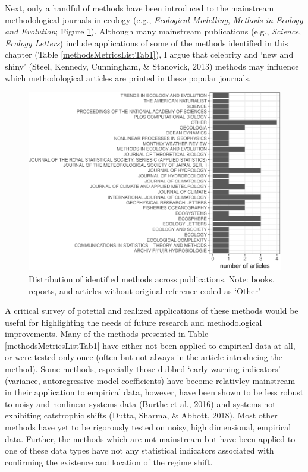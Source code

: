 \documentclass[12pt,twoside,openany]{reedthesis}
\begin{document}
Next, only a handful of methods have been introduced to the mainstream
methodological journals in ecology (e.g., \emph{Ecological Modelling},
\emph{Methods in Ecology and Evolution}; Figure \ref{fig:jrnlDistFig}).
Although many mainstream publications (e.g., \emph{Science},
\emph{Ecology Letters}) include applications of some of the methods
identified in this chapter (Table \ref{methodsMetricsListTab1}), I argue
that celebrity and `new and shiny' (Steel, Kennedy, Cunningham, \&
Stanovick, 2013) methods may influence which methodological articles are
printed in these popular journals.
\begin{figure}
\centering
\includegraphics{_myDissertation_files/figure-latex/jrnlDistFig-1.pdf}
\caption{\label{fig:jrnlDistFig}Distribution of identified methods across
publications. Note: books, reports, and articles without original
reference coded as `Other'}
\end{figure}
A critical survey of potetial and realized applications of these methods
would be useful for highlighting the needs of future research and
methodological improvements. Many of the methods presented in Table
\ref{methodsMetricsListTab1} have either not been applied to empirical
data at all, or were tested only once (often but not always in the
article introducing the method). Some methods, especially those dubbed
`early warning indicators' (variance, autoregressive model coefficients)
have become relativley mainstream in their application to empirical
data, however, have been shown to be less robust to noisy and nonlinear
systems data (Burthe et al., 2016) and systems not exhibiting
catstrophic shifts (Dutta, Sharma, \& Abbott, 2018). Most other methods
have yet to be rigorously tested on noisy, high dimensional, empirical
data. Further, the methods which are not mainstream but have been
applied to one of these data types have not any statistical indicators
associated with confirming the existence and location of the regime
shift.
\end{document}
